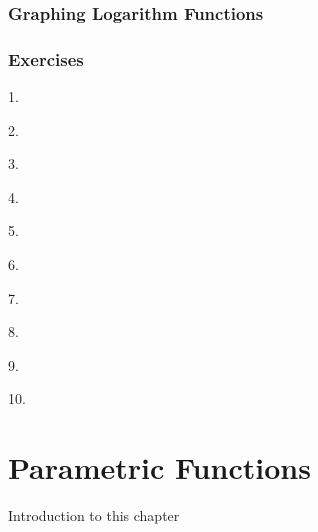 \documentclass[10pt,]{book}
\theoremstyle{plain}
\theoremstyle{definition}
\theoremstyle{definition}
\theoremstyle{definition}
\numberwithin{equation}{section}
\begin{document}
\subsection[{Graphing Logarithm Functions}]{Graphing Logarithm Functions}\label{subsection-4}
\hypertarget{p-332}{}%
%
\typeout{************************************************}
\typeout{************************************************}
\subsection[{Exercises}]{Exercises}\label{exercises-14}
\begin{exerciselist}
\item[1.]\hypertarget{exercise-91}{}\hypertarget{p-333}{}%
%
\par\smallskip
\item[2.]\hypertarget{exercise-92}{}\hypertarget{p-334}{}%
%
\par\smallskip
\item[3.]\hypertarget{exercise-93}{}\hypertarget{p-335}{}%
%
\par\smallskip
\item[4.]\hypertarget{exercise-94}{}\hypertarget{p-336}{}%
%
\par\smallskip
\item[5.]\hypertarget{exercise-95}{}\hypertarget{p-337}{}%
%
\par\smallskip
\item[6.]\hypertarget{exercise-96}{}\hypertarget{p-338}{}%
%
\par\smallskip
\item[7.]\hypertarget{exercise-97}{}\hypertarget{p-339}{}%
%
\par\smallskip
\item[8.]\hypertarget{exercise-98}{}\hypertarget{p-340}{}%
%
\par\smallskip
\item[9.]\hypertarget{exercise-99}{}\hypertarget{p-341}{}%
%
\par\smallskip
\item[10.]\hypertarget{exercise-100}{}\hypertarget{p-342}{}%
%
\par\smallskip
\end{exerciselist}
\typeout{************************************************}
\typeout{************************************************}
\chapter[{Parametric Functions}]{Parametric Functions}\label{chapter06}
\hypertarget{p-343}{}%
Introduction to this chapter%
\typeout{************************************************}
\typeout{************************************************}
\end{document}
